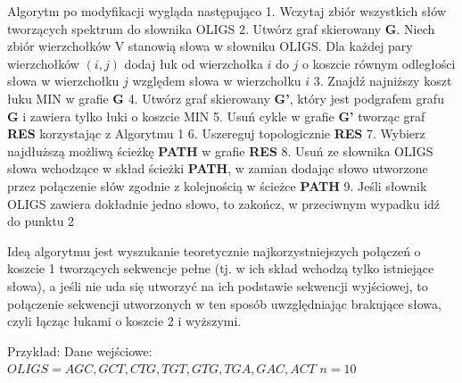 \documentclass[a4paper,10pt]{article}
\begin{document}
Algorytm po modyfikacji wygląda następująco
1. Wczytaj zbiór wszystkich słów tworzących spektrum do słownika OLIGS
2. Utwórz graf skierowany {\bf G}. Niech zbiór wierzchołków V stanowią słowa w słowniku OLIGS. Dla każdej pary wierzchołków $(i,j)$ dodaj łuk od wierzchołka $i$ do $j$ o koszcie równym odległości słowa w wierzchołku $j$ względem słowa w wierzchołku $i$
3. Znajdź najniższy koszt łuku MIN w grafie {\bf G}
4. Utwórz graf skierowany {\bf G'}, który jest podgrafem grafu {\bf G} i zawiera tylko łuki o koszcie MIN
5. Usuń cykle w grafie {\bf G'} tworząc graf {\bf RES} korzystając z Algorytmu 1
6. Uszereguj topologicznie {\bf RES}
7. Wybierz najdłuższą możliwą ścieżkę {\bf PATH} w grafie {\bf RES}
8. Usuń ze słownika OLIGS słowa wchodzące w skład ścieżki {\bf PATH}, w zamian dodając słowo utworzone przez połączenie słów zgodnie z kolejnością w ścieżce {\bf PATH}
9. Jeśli słownik OLIGS zawiera dokładnie jedno słowo, to zakończ, w przeciwnym wypadku idź do punktu 2

Ideą algorytmu jest wyszukanie teoretycznie najkorzystniejszych połączeń o koszcie 1 tworzących sekwencje pełne (tj. w ich skład wchodzą tylko istniejące słowa), a jeśli nie uda się utworzyć na ich podstawie sekwencji wyjściowej, to połączenie sekwencji utworzonych w ten sposób uwzględniając brakujące słowa, czyli łącząc łukami o koszcie 2 i wyższymi. 

Przykład:
Dane wejściowe:
$OLIGS = { AGC, GCT, CTG, TGT, GTG, TGA, GAC, ACT }$
$n = 10$

\end{document}
